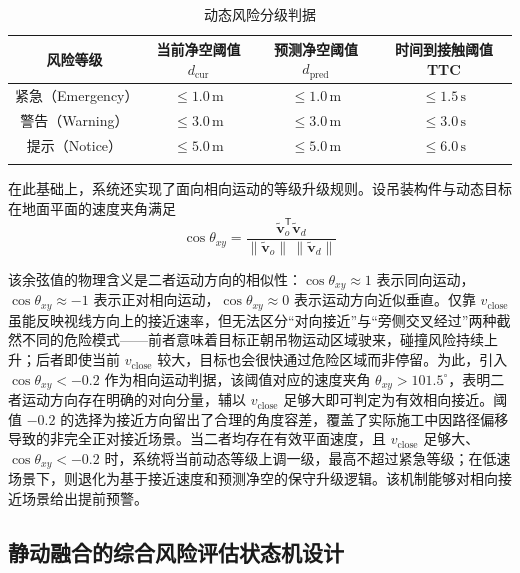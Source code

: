 \begin{table}[htbp]
\centering
\caption{动态风险分级判据}
\label{tab:ch5_dynamic_risk_criteria}
\begin{tabular*}{\textwidth}{@{\extracolsep{\fill}}cccc}
\Xhline{1pt}
\textbf{风险等级} & \textbf{当前净空阈值 $d_{\mathrm{cur}}$} & \textbf{预测净空阈值 $d_{\mathrm{pred}}$} & \textbf{时间到接触阈值 TTC} \\
\hline
紧急（Emergency） & $\leq 1.0\,\mathrm{m}$ & $\leq 1.0\,\mathrm{m}$ & $\leq 1.5\,\mathrm{s}$ \\
警告（Warning） & $\leq 3.0\,\mathrm{m}$ & $\leq 3.0\,\mathrm{m}$ & $\leq 3.0\,\mathrm{s}$ \\
提示（Notice） & $\leq 5.0\,\mathrm{m}$ & $\leq 5.0\,\mathrm{m}$ & $\leq 6.0\,\mathrm{s}$ \\
\Xhline{1pt}
\end{tabular*}
\end{table}

在此基础上，系统还实现了面向相向运动的等级升级规则。设吊装构件与动态目标在地面平面的速度夹角满足
\begin{equation}
\cos\theta_{xy}=\frac{\tilde{\mathbf{v}}_o^\mathsf{T}\tilde{\mathbf{v}}_d}{\|\tilde{\mathbf{v}}_o\|\,\|\tilde{\mathbf{v}}_d\|}
\end{equation}

该余弦值的物理含义是二者运动方向的相似性：$\cos\theta_{xy}\approx 1$ 表示同向运动，$\cos\theta_{xy}\approx -1$ 表示正对相向运动，$\cos\theta_{xy}\approx 0$ 表示运动方向近似垂直。仅靠 $v_{\mathrm{close}}$ 虽能反映视线方向上的接近速率，但无法区分“对向接近”与“旁侧交叉经过”两种截然不同的危险模式——前者意味着目标正朝吊物运动区域驶来，碰撞风险持续上升；后者即使当前 $v_{\mathrm{close}}$ 较大，目标也会很快通过危险区域而非停留。为此，引入 $\cos\theta_{xy}<-0.2$ 作为相向运动判据，该阈值对应的速度夹角 $\theta_{xy}>101.5^\circ$，表明二者运动方向存在明确的对向分量，辅以 $v_{\mathrm{close}}$ 足够大即可判定为有效相向接近。阈值 $-0.2$ 的选择为接近方向留出了合理的角度容差，覆盖了实际施工中因路径偏移导致的非完全正对接近场景。当二者均存在有效平面速度，且 $v_{\mathrm{close}}$ 足够大、$\cos\theta_{xy}<-0.2$ 时，系统将当前动态等级上调一级，最高不超过紧急等级；在低速场景下，则退化为基于接近速度和预测净空的保守升级逻辑。该机制能够对相向接近场景给出提前预警。

\subsection{静动融合的综合风险评估状态机设计}\label{subsec_ch5_warning_interface}


